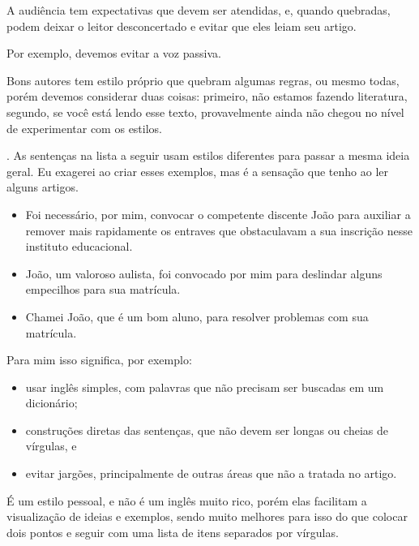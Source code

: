 \documentclass[openany]{book}
\begin{document}
 A audiência tem expectativas que devem ser atendidas, e, quando quebradas, podem deixar o leitor desconcertado e evitar que eles leiam seu artigo.

 Por exemplo, devemos evitar  a voz passiva.

Bons autores tem estilo próprio que quebram algumas regras, ou mesmo todas, porém devemos considerar duas coisas: primeiro, não estamos fazendo literatura, segundo, se você está lendo esse texto, provavelmente ainda não chegou no nível de experimentar com os estilos.

. As sentenças na lista a seguir usam estilos diferentes para passar a mesma ideia geral. Eu exagerei ao criar esses exemplos, mas é a sensação que tenho ao ler alguns artigos.
\begin{itemize}
    \item Foi necessário, por mim, convocar o competente discente João para auxiliar a remover mais rapidamente os entraves que obstaculavam a sua inscrição nesse instituto educacional.
    \item João, um valoroso aulista, foi convocado por mim para deslindar alguns empecilhos para sua matrícula.
    \item Chamei João, que é um bom aluno, para resolver problemas com sua matrícula.
\end{itemize}



 Para mim isso significa, por exemplo:
\begin{itemize}
    \item usar inglês simples, com palavras que não precisam ser buscadas em um dicionário;
    \item construções diretas das sentenças, que não devem ser longas ou cheias de vírgulas, e
    \item evitar jargões, principalmente de outras áreas que não a tratada no artigo.
\end{itemize}

 É um estilo pessoal, e não é um inglês muito rico, porém elas facilitam a visualização de ideias e exemplos, sendo muito melhores para isso do que colocar dois pontos e seguir com uma lista de itens separados por vírgulas.
\end{document}
